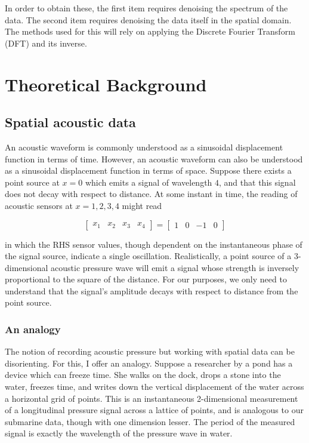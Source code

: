 \documentclass{article}
\begin{document}
In order to obtain these, the first item requires denoising the spectrum of the data. The second item requires denoising the data itself in the spatial domain. The methods used for this will rely on applying the Discrete Fourier Transform (DFT) and its inverse. 

\section{Theoretical Background}

\subsection{Spatial acoustic data}

An acoustic waveform is commonly understood as a sinusoidal displacement function in terms of time. However, an acoustic waveform can also be understood as a sinusoidal displacement function in terms of space. Suppose there exists a point source at $x=0$ which emits a signal of wavelength $4$, and that this signal does not decay with respect to distance. At some instant in time, the reading of acoustic sensors at $x=1, 2, 3, 4$ might read 

\begin{equation}
\begin{bmatrix}
x_1&x_2&x_3&x_4
\end{bmatrix}=\begin{bmatrix}
	1&0&-1&0
\end{bmatrix}
\label{eqn:spatial}
\end{equation}

in which the RHS sensor values, though dependent on the instantaneous phase of the signal source, indicate a single oscillation. Realistically, a point source of a 3-dimensional acoustic pressure wave will emit a signal whose strength is inversely proportional to the square of the distance. For our purposes, we only need to understand that the signal's amplitude decays with respect to distance from the point source. 


\subsubsection{An analogy}
The notion of recording acoustic pressure but working with spatial data can be disorienting. For this, I offer an analogy. Suppose a researcher by a pond has a device which can freeze time. She walks on the dock, drops a stone into the water, freezes time, and writes down the vertical displacement of the water across a horizontal grid of points. This is an instantaneous 2-dimensional measurement of a longitudinal pressure signal across a lattice of points, and is analogous to our submarine data, though with one dimension lesser. The period of the measured signal is exactly the wavelength of the pressure wave in water.
\end{document}
